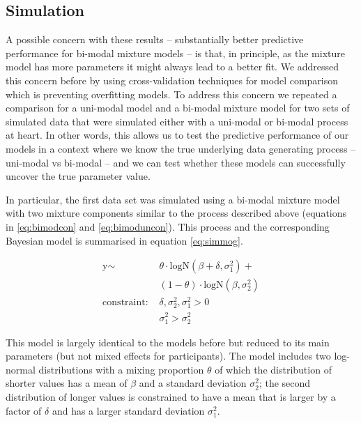\documentclass[
  english,
  man,floatsintext]{apa7}
\begin{document}
\clearpage
\makeatletter
\efloat@restorefloats
\makeatother


\begin{appendix}
\section{}
\hypertarget{simulation}{%
\subsection{Simulation}\label{simulation}}

A possible concern with these results -- substantially better predictive
performance for bi-modal mixture models -- is that, in principle, as the
mixture model has more parameters it might always lead to a better fit.
We addressed this concern before by using cross-validation techniques
for model comparison which is preventing overfitting models. To address
this concern we repeated a comparison for a uni-modal model and a
bi-modal mixture model for two sets of simulated data that were
simulated either with a uni-modal or bi-modal process at heart. In other
words, this allows us to test the predictive performance of our models
in a context where we know the true underlying data generating process
-- uni-modal vs bi-modal -- and we can test whether these models can
successfully uncover the true parameter value.

In particular, the first data set was simulated using a bi-modal mixture
model with two mixture components similar to the process described above
(equations in \ref{eq:bimodcon} and \ref{eq:bimoduncon}). This process
and the corresponding Bayesian model is summarised in equation
\ref{eq:simmog}.

\begin{equation}
\begin{aligned}
\label{eq:simmog}
\text{y} \sim\text{ } & \theta \cdot \text{logN}(\beta + \delta, \sigma^2_1) +\\
& (1 - \theta) \cdot \text{logN}(\beta, \sigma^2_2)\\
\text{constraint: } & \delta, \sigma_\text{2}^2, \sigma_\text{1}^2>0\\
        & \sigma_{1}^2 > \sigma_{2}^2
\end{aligned}
\end{equation}

This model is largely identical to the models before but reduced to its
main parameters (but not mixed effects for participants). The model
includes two log-normal distributions with a mixing proportion
\(\theta\) of which the distribution of shorter values has a mean of
\(\beta\) and a standard deviation \(\sigma^2_2\); the second
distribution of longer values is constrained to have a mean that is
larger by a factor of \(\delta\) and has a larger standard deviation
\(\sigma^2_1\).


\end{appendix}
\end{document}
